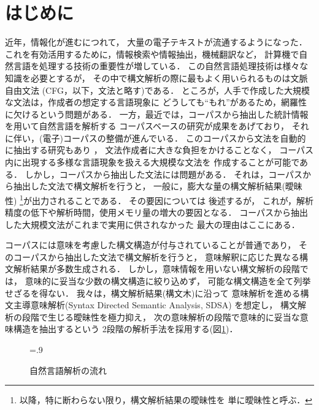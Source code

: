 

\maketitle

\section{はじめに}
\label{sec:Introduction}

近年，情報化が進むにつれて，
大量の電子テキストが流通するようになった．
これを有効活用するために，情報検索や情報抽出，機械翻訳など，
計算機で自然言語を処理する技術の重要性が増している．
この自然言語処理技術は様々な知識を必要とするが，
その中で構文解析の際に最もよく用いられるものは文脈自由文法
(CFG，以下，文法と略す)である．
ところが，人手で作成した大規模な文法は，作成者の想定する言語現象に
どうしても``もれ''があるため，網羅性に欠けるという問題がある．
一方，最近では，コーパスから抽出した統計情報を用いて自然言語を解析する
コーパスベースの研究が成果をあげており，
それに伴い，(電子)コーパスの整備が進んでいる．
このコーパスから文法を自動的に抽出する研究もあり
\cite{charniak:96,shirai:97}，
文法作成者に大きな負担をかけることなく，
コーパス内に出現する多様な言語現象を扱える大規模な文法を
作成することが可能である．
しかし，コーパスから抽出した文法には問題がある．
それは，コーパスから抽出した文法で構文解析を行うと，
一般に，膨大な量の構文解析結果(曖昧性)
\footnote{以降，特に断わらない限り，構文解析結果の曖昧性を
単に曖昧性と呼ぶ．}が出力されることである．
その要因については
後述するが，
これが，解析精度の低下や解析時間，使用メモリ量の増大の要因となる．
コーパスから抽出した大規模文法がこれまで実用に供されなかった
最大の理由はここにある．

コーパスには意味を考慮した構文構造が付与されていることが普通であり，
そのコーパスから抽出した文法で構文解析を行うと，
意味解釈に応じた異なる構文解析結果が多数生成される．
しかし，意味情報を用いない構文解析の段階では，
意味的に妥当な少数の構文構造に絞り込めず，
可能な構文構造を全て列挙せざるを得ない．
我々は，構文解析結果(構文木)に沿って
意味解析を進める構文主導意味解析(Syntax Directed Semantic Analysis, SDSA)
\cite{jurafsky:2000}を想定し，
構文解析の段階で生じる曖昧性を極力抑え，
次の意味解析の段階で意味的に妥当な意味構造を抽出するという
2段階の解析手法を採用する(図\ref{fig:analysis_flow})．

\begin{figure}[tp]
  \centering
  \epsfxsize=.9\textwidth
  \caption{自然言語解析の流れ}
  \label{fig:analysis_flow}
\end{figure}

